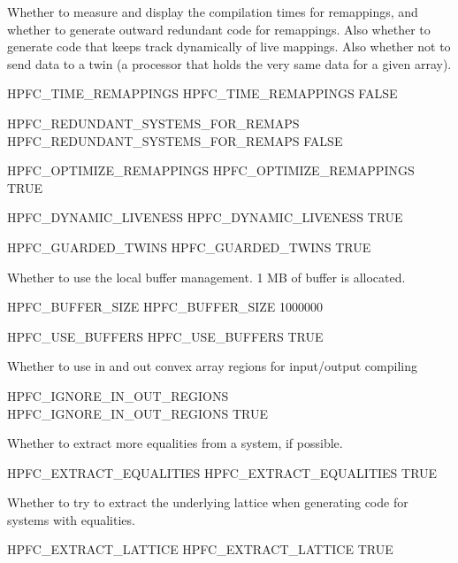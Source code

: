 \documentclass[a4paper]{report}
\begin{document}
Whether to measure and display the compilation times for remappings,
and whether to generate outward redundant code for remappings. Also
whether to generate code that keeps track dynamically of live mappings.
Also whether not to send data to a twin (a processor that holds the very
same data for a given array).

\begin{PipsProp}{HPFC_TIME_REMAPPINGS}
HPFC_TIME_REMAPPINGS FALSE
\end{PipsProp}
\begin{PipsProp}{HPFC_REDUNDANT_SYSTEMS_FOR_REMAPS}
HPFC_REDUNDANT_SYSTEMS_FOR_REMAPS FALSE
\end{PipsProp}
\begin{PipsProp}{HPFC_OPTIMIZE_REMAPPINGS}
HPFC_OPTIMIZE_REMAPPINGS TRUE
\end{PipsProp}
\begin{PipsProp}{HPFC_DYNAMIC_LIVENESS}
HPFC_DYNAMIC_LIVENESS TRUE
\end{PipsProp}
\begin{PipsProp}{HPFC_GUARDED_TWINS}
HPFC_GUARDED_TWINS TRUE
\end{PipsProp}

Whether to use the local buffer management. 1 MB of buffer is allocated.

\begin{PipsProp}{HPFC_BUFFER_SIZE}
HPFC_BUFFER_SIZE 1000000
\end{PipsProp}
\begin{PipsProp}{HPFC_USE_BUFFERS}
HPFC_USE_BUFFERS TRUE
\end{PipsProp}

Whether to use in and out convex array regions for input/output compiling

\begin{PipsProp}{HPFC_IGNORE_IN_OUT_REGIONS}
HPFC_IGNORE_IN_OUT_REGIONS TRUE
\end{PipsProp}

Whether to extract more equalities from a system, if possible.

\begin{PipsProp}{HPFC_EXTRACT_EQUALITIES}
HPFC_EXTRACT_EQUALITIES TRUE
\end{PipsProp}

Whether to try to extract the underlying lattice when generating code for
systems with equalities.

\begin{PipsProp}{HPFC_EXTRACT_LATTICE}
HPFC_EXTRACT_LATTICE TRUE
\end{PipsProp}
\end{document}
